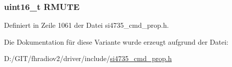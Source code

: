 \subsubsection[{R\+M\+U\+T\+E}]{\setlength{\rightskip}{0pt plus 5cm}uint16\+\_\+t R\+M\+U\+T\+E}\label{unionrx__hard__mute_a21b48010c5f26c6dc60ad46364bc10a0}


Definiert in Zeile 1061 der Datei si4735\+\_\+cmd\+\_\+prop.\+h.



Die Dokumentation für diese Variante wurde erzeugt aufgrund der Datei\+:\begin{DoxyCompactItemize}
\item 
D\+:/\+G\+I\+T/fhradiov2/driver/include/\hyperlink{si4735__cmd__prop_8h}{si4735\+\_\+cmd\+\_\+prop.\+h}\end{DoxyCompactItemize}
